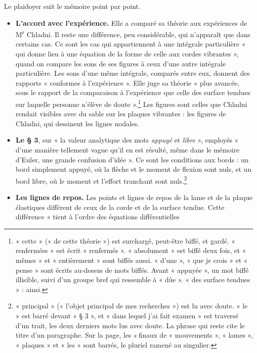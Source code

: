 \documentclass[11pt,a4paper]{article}
\begin{document}
Le plaidoyer suit le mémoire point par point.
\begin{itemize}
  \item \textbf{L'accord avec l'expérience.} Elle a comparé sa théorie aux
    expériences de M\textsuperscript{r} Chladni. Il reste une différence, peu
    considérable, qui n'apparaît que dans certains cas. Ce sont les cas qui
    appartiennent à une intégrale particulière « qui donne lieu à une
    équation de la forme de celle aux cordes vibrantes », quand on compare
    les sons de ses figures à ceux d'une autre intégrale particulière. Les
    sons d'une même intégrale, comparés entre eux, donnent des rapports
    « conformes à l'expérience ». Elle juge sa théorie « plus avancée, sous le
    rapport de la comparaison à l'expérience que celle des surface tendues
    sur laquelle personne n'élève de doute ».\footnote{« cette » (« de cette
    théorie ») est surchargé, peut-être biffé, et gardé. « renfermées » est
    écrit « renfermés ». « absolument » est biffé deux fois, et « mêmes » et
    « entièrement » sont biffés aussi. « d'une », « que je crois » et
    « pense » sont écrits au-dessus de mots biffés. Avant « appuyée », un mot
    biffé illisible, suivi d'un groupe bref qui ressemble à « dûe ». « des
    surface tendues » : ainsi.} Les figures sont celles que Chladni rendait
    visibles avec du sable sur les plaques vibrantes : les figures de Chladni,
    qui dessinent les lignes nodales.
  \item \textbf{Le § 3}, sur « la valeur analytique des mots \emph{appuyé} et
    \emph{libre} », employés « d'une manière tellement vague qu'il en est
    résulté, même dans le mémoire d'Euler, une grande confusion d'idée ». Ce
    sont les conditions aux bords : un bord simplement appuyé, où la flèche
    et le moment de flexion sont nuls, et un bord libre, où le moment et
    l'effort tranchant sont nuls.\footnote{« principal » (« l'objet principal
    de mes recherches ») est lu avec doute. « le » est barré devant « § 3 »,
    et « dans lequel j'ai fait examen » est traversé d'un trait, les deux
    derniers mots lus avec doute. La phrase qui reste cite le titre d'un
    paragraphe. Sur la page, les \emph{s} finaux de « mouvements », « lames »,
    « plaques » et « les » sont barrés, le pluriel ramené au singulier.}
  \item \textbf{Les lignes de repos.} Les points et lignes de repos de la lame
    et de la plaque élastiques diffèrent de ceux de la corde et de la surface
    tendue. Cette différence « tient à l'ordre des équations différentielles

\end{itemize}
\end{document}
